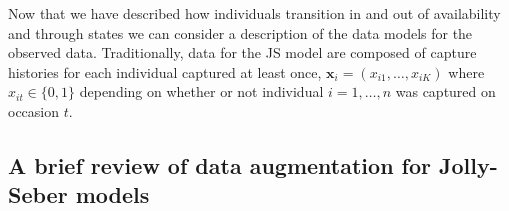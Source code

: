 \documentclass[12pt]{article}
\newcommand{\bx}{\ensuremath{\mathbf{x}}}
\begin{document}
Now that we have described how individuals transition in and out of availability and through states we can consider a description of the data models for the observed data. Traditionally, data for the JS model are composed of capture histories for each individual captured at least once, $\bx_i = (x_{i1},\dots,x_{iK})$ where $x_{it} \in \{0,1\}$ depending on whether or not individual $i=1,\dots,n$ was captured on occasion $t$. 
%


\subsection{A brief review of data augmentation for Jolly-Seber models}
\end{document}
